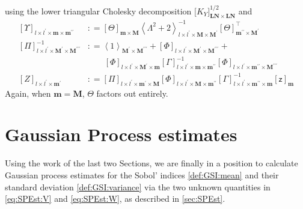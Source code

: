 \documentclass[preprint,12pt]{elsarticle}
\newcommand*{\M}[1]{\ensuremath{#1}\xspace}
\newcommand*{\x}{\times}
\newcommand*{\mi}[1]{\mathbf{#1}}
\newcommand*{\rv}[1]{\mathsf{#1}}
\newcommand*{\te}[2][]{\left\lbrack{#2}\right\rbrack_{#1}}
\newcommand*{\tte}[2][]{\lbrack{#2}\rbrack_{#1}}
\newcommand*{\diag}[2][]{\left\langle{#2}\right\rangle_{#1}}
\newcommand*{\deq}{\M{\mathrel{\mathop:}=}}
\begin{document}
            using the lower triangular Cholesky decomposition $\tte[\mi{LN}\x\mi{LN}]{K_{Y}}^{1/2}$ and
            \begin{equation*}
                \begin{aligned}
                    \te[l\x l^{\prime}\x\mi{m}\x\mi{m^{\prime\prime}}]{\Upsilon} &\deq 
                    \te[\mi{m}\x\mi{M}]{\Theta}
                    \diag[l\x l^{\prime}\x\mi{M}\x\mi{M^{\prime}}]{\Lambda^{2}+2}^{-1} \te[\mi{m^{\prime\prime}}\x\mi{M^{\prime}}]{\Theta}^{\intercal} \\
                    \te[l\x l^{\prime}\x \mi{M^{\prime}}\x\mi{M^{\prime\prime\prime}}]{\Pi}^{-1} &\deq 
                    \diag[\mi{M^{\prime}}\x\mi{M^{\prime\prime\prime}}]{1} + \te[l\x l^{\prime}\x \mi{M^{\prime}}\x\mi{M^{\prime\prime\prime}}]{\Phi} + \\
                    &\phantom{\deq}\ \te[l\x l^{\prime}\x\mi{M^{\prime}\x\mi{m}}]{\Phi}
                    \te[l\x l^{\prime}\x\mi{m}\x\mi{m^{\prime\prime}}]{\Gamma}^{-1} \te[l\x l^{\prime}\x\mi{m^{\prime\prime}}\x\mi{M^{\prime\prime\prime}}]{\Phi} \\
                    \te[l\x l^{\prime}\x \mi{m^{\prime}}]{Z} &\deq 
                    \te[l\x l^{\prime}\x \mi{m^{\prime}}\x\mi{M}]{\Pi}
                    \te[l\x l^{\prime}\x\mi{M}\x\mi{m^{\prime\prime}}]{\Phi}
                    \te[l\x l^{\prime}\x\mi{m^{\prime\prime}}\x\mi{m}]{\Gamma}^{-1}
                    \te[\mi{m}]{\rv{z}}
                \end{aligned}
            \end{equation*}
            Again, when $\mi{m} = \mi{M}$, $\Theta$ factors out entirely.


\section{Gaussian Process estimates}\label{sec:GPEst}
    Using the work of the last two Sections, we are finally in a position to calculate Gaussian process estimates for the Sobol' indices \cref{def:GSI:mean} and their standard deviation \cref{def:GSI:variance} via the two unknown quantities in \cref{eq:SPEst:V} and \cref{eq:SPEst:W}, as described in \cref{sec:SPEst}.
\end{document}

